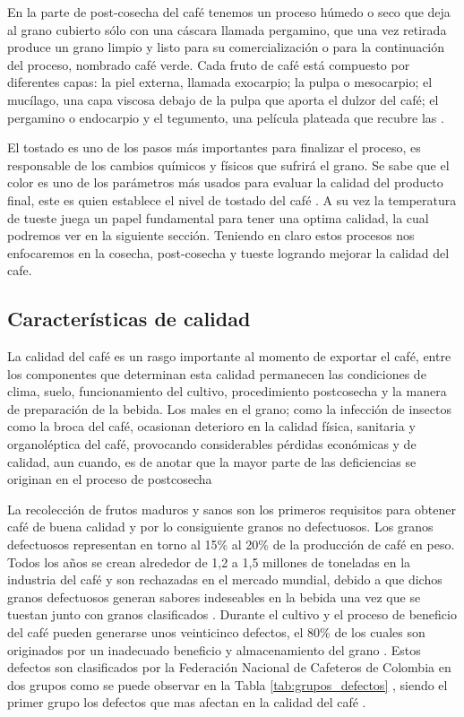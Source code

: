 En la parte de post-cosecha del café tenemos un proceso húmedo o seco que deja al grano cubierto sólo con una cáscara llamada pergamino, que una vez retirada produce un grano limpio y listo para su comercialización o para la continuación del proceso, nombrado café verde. Cada fruto de café está compuesto por diferentes capas: la piel externa, llamada exocarpio; la pulpa o mesocarpio; el mucílago, una capa viscosa debajo de la pulpa que aporta el dulzor del café; el pergamino o endocarpio y el tegumento, una película plateada que recubre las \citep{Beneficio}.\medskip

El tostado es uno de los pasos más importantes para finalizar el proceso, es responsable de los cambios químicos y físicos que sufrirá el grano. Se sabe que el color es uno de los parámetros más usados para evaluar la calidad del producto final, este es quien establece el nivel de tostado del café \citep{Tostado}. A su vez la temperatura \citep{TuesteTemp} de tueste juega un papel fundamental para tener una optima calidad, la cual podremos ver en la siguiente sección. Teniendo en claro estos procesos nos enfocaremos en la cosecha, post-cosecha y tueste logrando mejorar la calidad del cafe.


\subsection{Características de calidad}

La calidad del café es un rasgo importante al momento de exportar el café, entre los componentes que determinan esta calidad permanecen las condiciones de clima, suelo, funcionamiento del cultivo, procedimiento postcosecha y la manera de preparación de la bebida. Los males en el grano; como la infección de insectos como la broca del café, ocasionan deterioro en la calidad física, sanitaria y organoléptica del café, provocando considerables pérdidas económicas y de calidad, aun cuando, es de anotar que la mayor parte de las deficiencias se originan en el proceso de postcosecha \citep{puerta1999influencia}\medskip

La recolección de frutos maduros y sanos son los primeros requisitos para obtener café de buena calidad \citep{puerta2016calidad} y por lo consiguiente granos no defectuosos. Los granos defectuosos representan en torno al 15\% al 20\% de la producción de café en peso. Todos los años se crean alrededor de 1,2 a 1,5 millones de toneladas en la industria del café y son rechazadas en el mercado mundial, debido a que dichos granos defectuosos generan sabores indeseables en la bebida una vez que se tuestan junto con granos clasificados \citep{ramalakshmi2007physicochemical}. Durante el cultivo y el proceso de beneficio del café pueden generarse unos veinticinco defectos, el 80\% de los cuales son originados por un inadecuado beneficio y almacenamiento del grano \cite{puerta2001como}. Estos defectos son clasificados por la Federación Nacional de Cafeteros de Colombia en dos grupos como se puede observar en la Tabla \ref{tab:grupos_defectos} , siendo el primer grupo los defectos que mas afectan en la calidad del café \cite{resolucion}. \medskip

